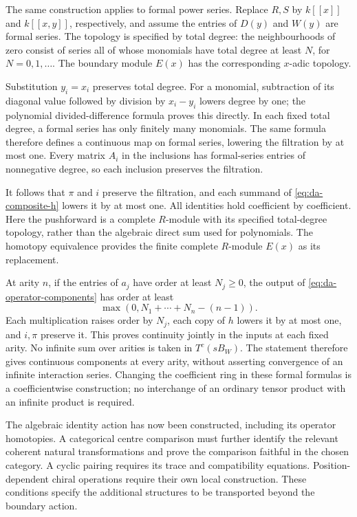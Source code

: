 The same construction applies to formal power series.
Replace \(R,S\) by \(k[[x]]\) and \(k[[x,y]]\), respectively,
and assume the entries of \(D(y)\) and \(W(y)\) are formal
series. The topology is specified by total degree: the
neighbourhoods of zero consist of series all of whose monomials
have total degree at least \(N\), for \(N=0,1,\ldots\).
The boundary module \(E(x)\) has the corresponding \(x\)-adic
topology.

Substitution \(y_i=x_i\) preserves total degree.
For a monomial, subtraction of its diagonal value followed by
division by \(x_i-y_i\) lowers degree by one; the polynomial
divided-difference formula proves this directly.
In each fixed total degree, a formal series has only finitely
many monomials. The same formula therefore defines a continuous
map on formal series, lowering the filtration by at most one.
Every matrix \(A_i\) in the inclusions has formal-series entries
of nonnegative degree, so each inclusion preserves the
filtration.

It follows that \(\pi\) and \(i\) preserve the filtration, and
each summand of \eqref{eq:da-composite-h} lowers it by at most
one. All identities hold coefficient by coefficient. Here the
pushforward is a complete \(R\)-module with its specified
total-degree topology, rather than the algebraic direct sum
used for polynomials. The homotopy equivalence provides the
finite complete \(R\)-module \(E(x)\) as its replacement.

At arity \(n\), if the entries of \(a_j\) have order at least
\(N_j\geq0\), the output of
\eqref{eq:da-operator-components} has order at least
\[
 \max(0,N_1+\cdots+N_n-(n-1)).
\]
Each multiplication raises order by \(N_j\), each copy of \(h\)
lowers it by at most one, and \(i,\pi\) preserve it.
This proves continuity jointly in the inputs at each fixed arity.
No infinite sum over arities is taken in
\(T^c(sB_W)\). The statement therefore gives continuous
components at every arity, without asserting convergence of
an infinite interaction series.
Changing the coefficient ring in these formal formulas is a
coefficientwise construction; no interchange of an ordinary
tensor product with an infinite product is required.

The algebraic identity action has now been constructed, including
its operator homotopies. A categorical centre comparison must
further identify the relevant coherent natural transformations
and prove the comparison faithful in the chosen category.
A cyclic pairing requires its trace and compatibility equations.
Position-dependent chiral operations require their own local
construction. These conditions specify the additional structures
to be transported beyond the boundary action.
